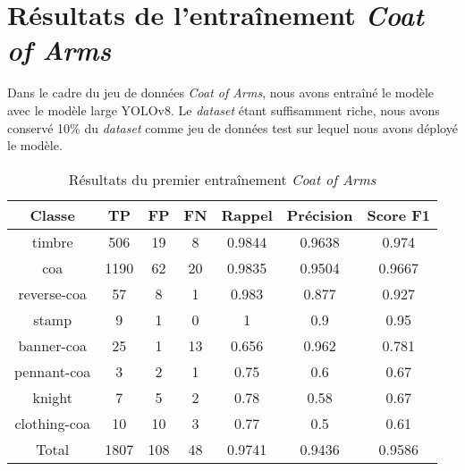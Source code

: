 \documentclass[12pt,twoside]{book}
\begin{document}
\section{Résultats de l'entraînement \textit{Coat of Arms}}

Dans le cadre du jeu de données \textit{Coat of Arms}, nous avons entraîné le modèle avec le modèle large YOLOv8. Le \textit{dataset} étant suffisamment riche, nous avons conservé 10\% du \textit{dataset} comme jeu de données test sur lequel nous avons déployé le modèle. \\

\begin{table}[ht]
    \centering
    \begin{tabular}{|c|c|c|c|c|c|c|}
    \hline
    \textbf{Classe} & \textbf{TP} & \textbf{FP} & \textbf{FN} & \textbf{Rappel} & \textbf{Précision} & \textbf{Score F1} \\
    \hline
    timbre & 506 & 19 & 8 & 0.9844 & 0.9638 & 0.974 \\ 
    \hline
    coa & 1190 & 62 & 20 & 0.9835 & 0.9504 & 0.9667 \\ 
    \hline
    reverse-coa & 57 & 8 & 1 & 0.983 & 0.877 & 0.927 \\ 
    \hline
    stamp & 9 & 1 & 0 & 1 & 0.9 & 0.95 \\ 
    \hline
    banner-coa & 25 & 1 & 13 & 0.656 & 0.962 & 0.781 \\ 
    \hline
    pennant-coa & 3 & 2 & 1 & 0.75 & 0.6 & 0.67 \\ 
    \hline
    knight & 7 & 5 & 2 & 0.78 & 0.58 & 0.67 \\ 
    \hline
    clothing-coa & 10 & 10 & 3 & 0.77 & 0.5 & 0.61 \\ 
    \hline
    Total & 1807 & 108 & 48 & 0.9741 & 0.9436 & 0.9586 \\
    \hline
    \end{tabular}
    \caption{Résultats du premier entraînement \textit{Coat of Arms}}
\end{table}
\end{document}
